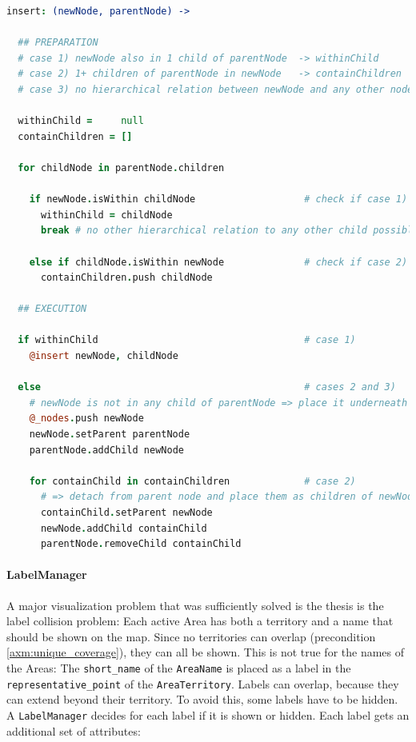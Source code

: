 \begin{center}
\begin{minipage}[t]{0.8\textwidth}
\begin{lstlisting}[language=coffeescript,
  caption=Insertion of a polygon node into the Within-Tree,
  label=lst:within_tree_insertion]
insert: (newNode, parentNode) ->

  ## PREPARATION
  # case 1) newNode also in 1 child of parentNode  -> withinChild
  # case 2) 1+ children of parentNode in newNode   -> containChildren
  # case 3) no hierarchical relation between newNode and any other node

  withinChild =     null
  containChildren = []

  for childNode in parentNode.children

    if newNode.isWithin childNode                   # check if case 1)
      withinChild = childNode
      break # no other hierarchical relation to any other child possible

    else if childNode.isWithin newNode              # check if case 2)
      containChildren.push childNode

  ## EXECUTION

  if withinChild                                    # case 1)
    @insert newNode, childNode

  else                                              # cases 2 and 3)
    # newNode is not in any child of parentNode => place it underneath
    @_nodes.push newNode
    newNode.setParent parentNode
    parentNode.addChild newNode

    for containChild in containChildren             # case 2)
      # => detach from parent node and place them as children of newNode
      containChild.setParent newNode
      newNode.addChild containChild
      parentNode.removeChild containChild
\end{lstlisting}
\end{minipage}
\end{center}


\paragraph{LabelManager} %
\label{par:labelmanager}

A major visualization problem that was sufficiently solved is the thesis is the label collision problem: Each active Area has both a territory and a name that should be shown on the map. Since no territories can overlap (precondition \ref{axm:unique_coverage}), they can all be shown. This is not true for the names of the Areas: The \texttt{short\_name} of the \texttt{AreaName} is placed as a label in the \texttt{representative\_point} of the \texttt{AreaTerritory}. Labels can overlap, because they can extend beyond their territory. To avoid this, some labels have to be hidden. A \texttt{LabelManager} decides for each label if it is shown or hidden. Each label gets an additional set of attributes:

